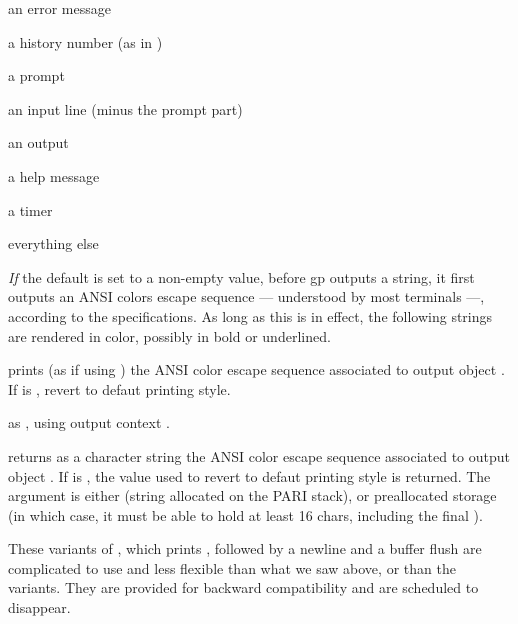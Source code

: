 \item {} an error message

\item {} a history number (as in )

\item {} a prompt

\item {} an input line (minus the prompt part)

\item {} an output

\item {} a help message

\item {} a timer

\item {} everything else

\emph{If} the  default is set to a non-empty value, before gp
outputs a string, it first outputs an ANSI colors escape sequence ---
understood by most terminals ---, according to the 
specifications. As long as this is in effect, the following strings are
rendered in color, possibly in bold or underlined.

 prints (as if using ) the ANSI
color escape sequence associated to output object . If  is
, revert to defaut printing style.

 as ,
using output context .

 returns as a character
string the ANSI color escape sequence associated to output object .
If  is , the value used to revert to defaut printing
style is returned. The argument  is either  (string
allocated on the PARI stack), or preallocated storage (in which case, it must
be able to hold at least 16 chars, including the final ).


These variants of , which prints , followed by
a newline and a buffer flush are complicated to use and less flexible
than what we saw above, or than the  variants. They are
provided for backward compatibility and are scheduled to disappear.


